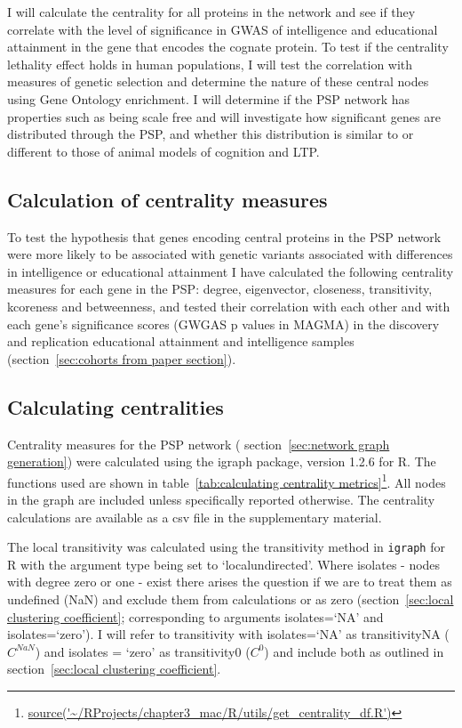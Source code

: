  I will calculate the centrality for all proteins in the network and see if they correlate with the level of significance in GWAS of intelligence and educational attainment in the gene that encodes the cognate protein. To test if the centrality lethality effect holds in human populations, I will test the correlation with measures of genetic selection and determine the nature of these central nodes using Gene Ontology enrichment. I will determine if the PSP network has properties such as being scale free and will investigate how significant genes are distributed through the PSP, and whether this distribution is similar to or different to those of animal models of cognition and LTP. 
 
    \subsection{Calculation of centrality measures}

To test the hypothesis that genes encoding central proteins in the  PSP network were more likely to be associated with genetic variants associated with differences in intelligence or educational attainment I have calculated the following centrality measures for each gene in the PSP: degree, eigenvector, closeness, transitivity, kcoreness and betweenness, and tested their correlation with each other and with each gene's significance scores (GWGAS p values in MAGMA) in the discovery and replication educational attainment and intelligence samples (section~\ref{sec:cohorts from paper section}). 


\subsection{Calculating centralities}
\label{sec:calculating centralities}
Centrality measures for the PSP network ( section~\ref{sec:network graph generation}) were calculated using the igraph package, version 1.2.6 for R. The functions used are shown in table~\ref{tab:calculating centrality metrics}\footnote{\url{source('~/RProjects/chapter3_mac/R/utils/get_centrality_df.R')}}. All nodes in the graph are included unless specifically reported otherwise. The centrality calculations are available as a csv file in the supplementary material.

The local transitivity was calculated using the transitivity method in \texttt{igraph} for R with the argument type being set to `localundirected'. Where isolates - nodes with degree zero or one - exist there arises the question if we are to treat them as undefined (NaN) and exclude them from calculations or as zero (section~\ref{sec:local clustering coefficient}; corresponding to arguments isolates=`NA' and isolates=`zero'). I will refer to transitivity with isolates=`NA' as transitivityNA ($C^{NaN}$) and isolates = `zero' as transitivity0 ($C^0$) and include both as outlined in section~\ref{sec:local clustering coefficient}\cite{schank2005approximating}.

